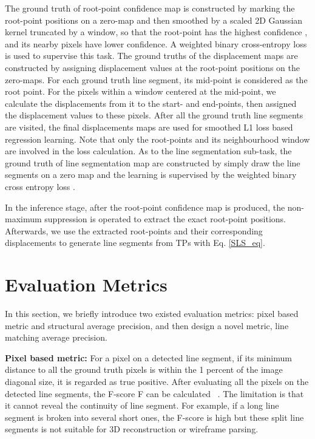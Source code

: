 \documentclass[runningheads]{llncs}
\begin{document}
The ground truth of root-point confidence map is constructed by marking the root-point positions on a zero-map and then smoothed by a scaled 2D Gaussian kernel truncated by a  window, so that the root-point has the highest confidence , and its nearby pixels have lower confidence. A weighted binary cross-entropy loss  is used to supervise this task. The ground truths of the displacement maps are constructed by assigning displacement values at the root-point positions on the zero-maps. For each ground truth line segment, its mid-point is considered as the root point. For the pixels within a  window centered at the mid-point, we calculate the displacements from it to the start- and end-points, then assigned the displacement values to these pixels. After all the ground truth line segments are visited, the final displacements maps are used for smoothed L1 loss  based regression learning. Note that only the root-points and its  neighbourhood window are involved in the loss calculation. As to the line segmentation sub-task, the ground truth of line segmentation map are constructed by simply draw the line segments on a zero map and the learning is supervised by the weighted binary cross entropy loss .

In the inference stage, after the root-point confidence map is produced, the non-maximum suppression is operated to extract the exact root-point positions.  Afterwards, we use the extracted root-points and their corresponding displacements to generate line segments from TPs with Eq. \eqref{SLS_eq}.



\section{Evaluation Metrics} \label{eva_matric}
In this section, we briefly introduce two existed evaluation metrics: pixel based metric and structural average precision, and then design a novel metric, line matching average precision.

\textbf{Pixel based metric:}
For a pixel on a detected line segment, if its minimum distance to all the ground truth pixels is within the 1 percent of the image diagonal size, it is regarded as true positive. After evaluating all the pixels on the detected line segments, the F-score F can be calculated ~\cite{Wireframe, AFM, LCNN}. The limitation is that it cannot reveal the continuity of line segment. For example, if a long line segment is broken into several short ones, the F-score is high but these split line segments is not suitable for 3D reconstruction or wireframe parsing.
\end{document}
